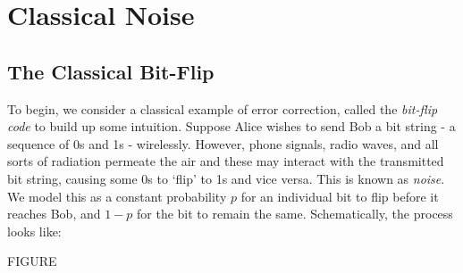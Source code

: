 \documentclass[12pt,a4paper]{report}
\numberwithin{equation}{section}
\theoremstyle{definition}
\theoremstyle{theorem}
\theoremstyle{theorem}
\theoremstyle{example}
\theoremstyle{definition}
\begin{document}
\section{Classical Noise}
\subsection{The Classical Bit-Flip}
To begin, we consider a classical example of error correction, called the \textit{bit-flip code} to build up some intuition. Suppose Alice wishes to send Bob a bit string - a sequence of 0s and 1s - wirelessly. However, phone signals, radio waves, and all sorts of radiation permeate the air and these may interact with the transmitted bit string, causing some 0s to `flip' to 1s and vice versa. This is known as \textit{noise}. We model this as a constant probability $p$ for an individual bit to flip before it reaches Bob, and $1-p$ for the bit to remain the same. Schematically, the process looks like:

FIGURE
\end{document}
